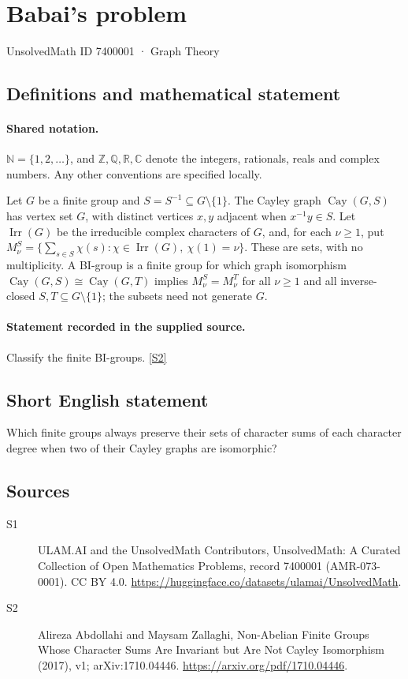 \documentclass[11pt]{article}
\newcommand{\sref}[2]{\hyperlink{source:#1:#2}{[S#2]}}
\begin{document}
\setcounter{section}{7400000}
\section{Babai's problem}\label{7400001}
{\small\sffamily UnsolvedMath ID 7400001 · Graph Theory}
\subsection{Definitions and mathematical statement}

\paragraph{Shared notation.}$\mathbb N=\{1,2,\ldots\}$, and $\mathbb Z,\mathbb Q,\mathbb R,\mathbb C$ denote the integers, rationals, reals and complex numbers. Any other conventions are specified locally.


Let $G$ be a finite group and $S=S^{-1}\subseteq G\setminus\{1\}$. The Cayley graph $\operatorname{Cay}(G,S)$ has vertex set $G$, with distinct vertices $x,y$ adjacent when $x^{-1}y\in S$. Let $\operatorname{Irr}(G)$ be the irreducible complex characters of $G$, and, for each $\nu\geq1$, put $M_\nu^S=\{\sum_{s\in S}\chi(s):\chi\in\operatorname{Irr}(G),\ \chi(1)=\nu\}$. These are sets, with no multiplicity. A BI-group is a finite group for which graph isomorphism $\operatorname{Cay}(G,S)\cong\operatorname{Cay}(G,T)$ implies $M_\nu^S=M_\nu^T$ for all $\nu\geq1$ and all inverse-closed $S,T\subseteq G\setminus\{1\}$; the subsets need not generate $G$.
\paragraph{Statement recorded in the supplied source.}
Classify the finite BI-groups. \sref{7400001}{2}
\subsection{Short English statement}
Which finite groups always preserve their sets of character sums of each character degree when two of their Cayley graphs are isomorphic?
\subsection{Sources}
\begin{description}
\item[\hypertarget{source:7400001:1}{S1}] ULAM.AI and the UnsolvedMath Contributors, UnsolvedMath: A Curated Collection of Open Mathematics Problems, record 7400001 (AMR-073-0001). CC BY 4.0. \url{https://huggingface.co/datasets/ulamai/UnsolvedMath}.
\item[\hypertarget{source:7400001:2}{S2}] Alireza Abdollahi and Maysam Zallaghi, Non-Abelian Finite Groups Whose Character Sums Are Invariant but Are Not Cayley Isomorphism (2017), v1; arXiv:1710.04446. \url{https://arxiv.org/pdf/1710.04446}.
\end{description}
\label{end:7400001}
\end{document}
